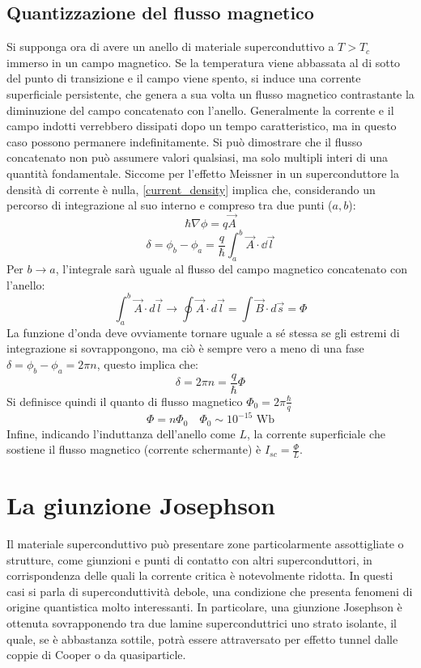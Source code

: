 \subsection{Quantizzazione del flusso magnetico}
Si supponga ora di avere un anello di materiale superconduttivo a $T>T_c$ immerso in un campo magnetico. Se la temperatura viene abbassata al di sotto del punto di transizione e il campo viene spento, si induce una corrente superficiale persistente, che genera a sua volta un flusso magnetico contrastante la diminuzione del campo concatenato con l'anello. Generalmente la corrente e il campo indotti verrebbero dissipati dopo un tempo caratteristico, ma in questo caso possono permanere indefinitamente. Si può dimostrare che il flusso concatenato non può assumere valori qualsiasi, ma solo multipli interi di una quantità fondamentale. Siccome per l'effetto Meissner in un superconduttore la densità di corrente è nulla, \eqref{current_density} implica che, considerando un percorso di integrazione al suo interno e compreso tra due punti ($a,b$):
\begin{equation*}
    \hbar\nabla\phi = q\vec A
\end{equation*}
\begin{equation*}
    \delta=\phi_b-\phi_a = \frac{q}{\hbar}\int_a^b\vec A\cdot \dd{\vec l}
\end{equation*}
Per $b\rightarrow a$, l'integrale sarà uguale al flusso del campo magnetico concatenato con l'anello:
\begin{equation*}
    \int_a^b\vec A\cdot d\vec l\rightarrow\oint\vec A\cdot d\vec l=\int \vec B \cdot d\vec s=\Phi 
\end{equation*}
La funzione d'onda deve ovviamente tornare uguale a sé stessa se gli estremi di integrazione si sovrappongono, ma ciò è sempre vero a meno di una fase $\delta=\phi_b-\phi_a=2\pi n$, questo implica che:
\begin{equation*}
    \delta=2\pi n=\frac{q}{\hbar}\Phi
\end{equation*}
Si definisce quindi il quanto di flusso magnetico $\Phi_0=2\pi\frac\hbar q$
\begin{equation*}
    \Phi=n\Phi_0 \quad \Phi_0\sim 10^{-15}\text{ Wb}
\end{equation*}
Infine, indicando l'induttanza dell'anello come $L$, la corrente superficiale che sostiene il flusso magnetico (corrente schermante) è
$I_{sc}=\frac{\Phi}{L}$.

\section{La giunzione Josephson}
Il materiale superconduttivo può presentare zone particolarmente assottigliate o strutture, come giunzioni e punti di contatto con altri superconduttori, in corrispondenza delle quali la corrente critica è notevolmente ridotta. In questi casi si parla di superconduttività debole, una condizione che presenta fenomeni di origine quantistica molto interessanti. In particolare, una giunzione Josephson è ottenuta sovrapponendo tra due lamine superconduttrici uno strato isolante, il quale, se è abbastanza sottile, potrà essere attraversato per effetto tunnel dalle coppie di Cooper o da quasiparticle.

